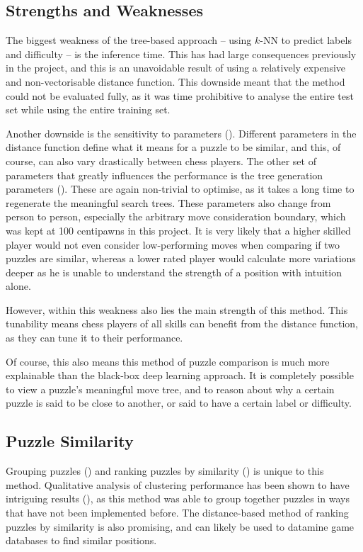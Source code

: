\subsection{Strengths and Weaknesses}\label{evalS41}

The biggest weakness of the tree-based approach -- using $k$-NN to predict
labels and difficulty -- is the inference time. This has had large consequences
previously in the project, and this is an unavoidable result of using a
relatively expensive and non-vectorisable distance function. This downside
meant that the method could not be evaluated fully, as it was time prohibitive
to analyse the entire test set while using the entire training set.

Another downside is the sensitivity to parameters (). Different
parameters in the distance function define what it means for a puzzle to be
similar, and this, of course, can also vary drastically between chess players.
The other set of parameters that greatly influences the performance is the tree
generation parameters (). These are again non-trivial to
optimise, as it takes a long time to regenerate the meaningful search trees.
These parameters also change from person to person, especially the arbitrary
move consideration boundary, which was kept at 100 centipawns in this project.
It is very likely that a higher skilled player would not even consider
low-performing moves when comparing if two puzzles are similar, whereas a lower
rated player would calculate more variations deeper as he is unable to
understand the strength of a position with intuition alone.

However, within this weakness also lies the main strength of this method. This
tunability means chess players of all skills can benefit from the distance
function, as they can tune it to their performance.

Of course, this also means this method of puzzle comparison is much more
explainable than the black-box deep learning approach. It is completely
possible to view a puzzle's meaningful move tree, and to reason about why a
certain puzzle is said to be close to another, or said to have a certain label
or difficulty.

\subsection{Puzzle Similarity}\label{evalS42}

Grouping puzzles () and ranking puzzles by similarity
() is unique to this method. Qualitative analysis of clustering
performance has been shown to have intriguing results (), as this
method was able to group together puzzles in ways that have not been
implemented before. The distance-based method of ranking puzzles by similarity
is also promising, and can likely be used to datamine game databases to find
similar positions. 

